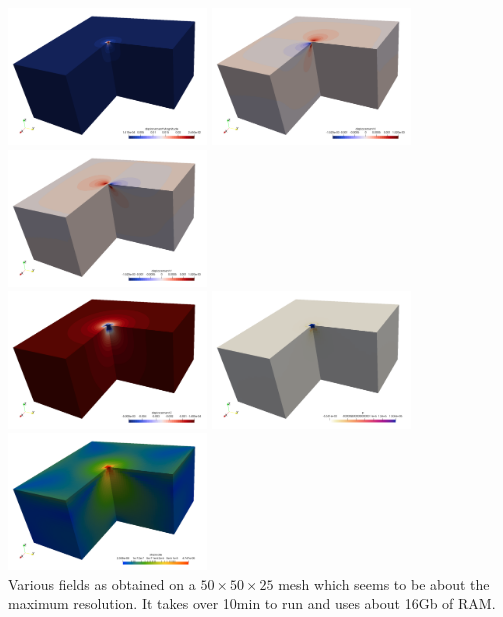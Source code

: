 \begin{center}
\includegraphics[width=5.27cm]{python_codes/fieldstone_123/results/exp2/50/disp} 
\includegraphics[width=5.27cm]{python_codes/fieldstone_123/results/exp2/50/dispx} 
\includegraphics[width=5.27cm]{python_codes/fieldstone_123/results/exp2/50/dispy} \\
\includegraphics[width=5.27cm]{python_codes/fieldstone_123/results/exp2/50/dispz} 
\includegraphics[width=5.27cm]{python_codes/fieldstone_123/results/exp2/50/press} 
\includegraphics[width=5.27cm]{python_codes/fieldstone_123/results/exp2/50/strain}\\ 
{\captionfont Various fields as obtained on a $50\times 50 \times25$ mesh
which seems to be about the maximum resolution. It takes over 10min to run and uses about 16Gb of RAM.}
\end{center}

